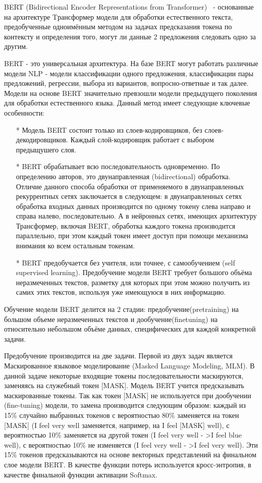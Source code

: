 BERT (Bidirectional Encoder Representations from Transformer)~\cite{devlin_2018} - основанные на архитектуре Tрансформер модели для обработки естественного текста, предобученные одноимённым методом на задачах предсказания токена по контексту и определения того, могут ли данные 2 предложения следовать одно за другим. 

BERT - это универсальная архитектура. На базе BERT могут работать различные модели NLP - модели классификации одного предложения, классификации пары предложений, регрессии, выбора из вариантов, вопросно-ответные и так далее. Модели на основе BERT значительно превзошли модели предыдущего поколения для обработки естественного языка. 
Данный метод имеет следующие ключевые особенности:
\begin{itemize}
\item[*] Модель BERT состоит только из слоев-кодировщиков, без слоев-декодировщиков. Каждый слой-кодировщик работает с выбором предыщушего слоя.
\item[*] BERT обрабатывает всю последовательность одновременно. По определению авторов, это двунаправленная (bidirectional) обработка. Отличие данного способа обработки от применяемого в двунаправленных рекуррентных сетях заключается в следующем: в двунаправленных сетях обработка входных данных производится по одному токену слева направо и справа налево, последовательно. А в нейронных сетях, имеющих архитектуру Трансформер, включая BERT, обработка каждого токена производится параллельно, при этом каждый токен имеет доступ при помощи механизма внимания ко всем остальным токенам. 
\item[*] BERT предобучается без учителя, или точнее, с самообучением (self supervised learning). Предобучение модели BERT требует большого объёма неразмеченных текстов, разметку для которых при этом можно получить из самих этих текстов, используя уже имеющуюся в них информацию.
\end{itemize}
Обучение модели BERT делится на 2 стадии: предобучение(pretraining) на большом объеме неразмеченных текстов и дообучение(finetuning) на относительно небольшом объёме данных, специфических для каждой конкретной задачи. 

Предобучение производится на две задачи. Первой из двух задач является Маскированное языковое моделирование (Masked Language Modeling, MLM). В данной задаче некоторые входящие токены последовательности маскируются, заменяясь на служебный токен [MASK]. Модель BERT учится предсказывать маскированные токены. Так как токен [MASK] не используется при дообучении (fine-tuning) модели, то замена производится следующим образом: каждый из 15\% случайно выбранных токенов с вероятностью 80\% заменяется на токен [MASK] (I feel very well заменяется, например, на I feel [MASK] well), с вероятностью 10\% заменяется на другой токен (I feel very well - >I feel blue well), с вероятностью 10\% не изменяется (I feel very well - >I feel very well). Эти 15\% токенов предсказываются на основе векторных представлений на финальном слое модели BERT. В качестве функции потерь используется кросс-энтропия, в качестве финальной функции активации Softmax. 

